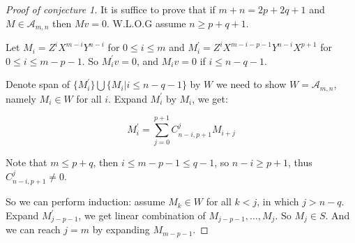 \begin{proof}[Proof of conjecture 1]
It is suffice to prove that if $m+n=2p+2q+1$ and $M\in \mathcal{A}_{m,n}$ then $Mv=0$. W.L.O.G assume $n\ge p+q+1$.

Let $M_i=Z^iX^{m-i}Y^{n-i}$ for $0\le i\le m$ and $M^{\prime}_i=Z^i X^{m-i-p-1} Y^{n-i} X^{p+1}$ for $0\le i\le m-p-1$. So $M^{\prime}_i v=0$, and $M_i v=0$ if $i\le n-q-1$. 

Denote span of $\{M^{\prime}_i\}\bigcup\{M_i| i\le n-q-1\}$ by $W$ we need to show $W=\mathcal{A}_{m,n}$, namely $M_i\in W$ for all $i$. Expand $M^{\prime}_i$ by $M_i$, we get: 

$$M^{\prime}_i=\sum_{j=0}^{p+1}C_{n-i,p+1}^{j}M_{i+j}$$

Note that $m\le p+q$, then $i\le m-p-1 \le q-1$, so $n-i\ge p+1$, thus $C_{n-i,p+1}^{j}\not =0$. 

So we can perform induction: assume $M_k\in W$ for all $k < j$, in which $j>n-q$. Expand $M^{\prime}_{j-p-1}$, we get linear combination of $M_{j-p-1},\dots,M_{j}$. So $M_{j}\in S$. And we can reach $j=m$ by expanding $M_{m-p-1}$.


\end{proof}
